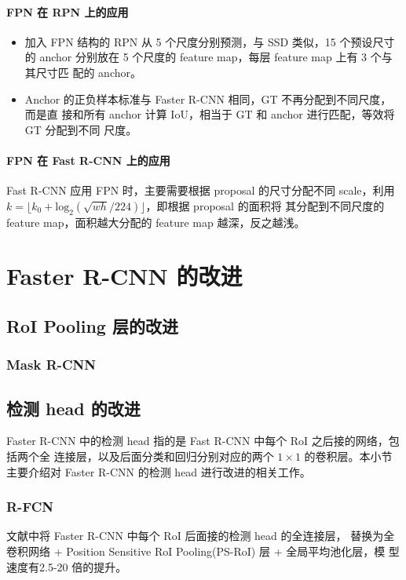 \paragraph{FPN 在 RPN 上的应用}

\begin{itemize}
  \item 加入 FPN 结构的 RPN 从 5 个尺度分别预测，与 SSD 类似，15 个预设尺寸的
    anchor 分别放在 5 个尺度的 feature map，每层 feature map 上有 3 个与其尺寸匹
    配的 anchor。
  \item Anchor 的正负样本标准与 Faster R-CNN 相同，GT 不再分配到不同尺度，而是直
    接和所有 anchor 计算 IoU，相当于 GT 和 anchor 进行匹配，等效将 GT 分配到不同
    尺度。
\end{itemize}

\paragraph{FPN 在 Fast R-CNN 上的应用}

Fast R-CNN 应用 FPN 时，主要需要根据 proposal 的尺寸分配不同 scale，利用 $ k =
\lfloor k_0 + \mathrm{log}_2 ( \sqrt{wh}/224 ) \rfloor$，即根据 proposal 的面积将
其分配到不同尺度的 feature map，面积越大分配的 feature map 越深，反之越浅。

\section{Faster R-CNN 的改进}
\label{sec:faster-improve}

\subsection{RoI Pooling 层的改进}
\subsubsection{Mask R-CNN}

\subsection{检测 head 的改进}
Faster R-CNN 中的检测 head 指的是 Fast R-CNN 中每个 RoI 之后接的网络，包括两个全
连接层，以及后面分类和回归分别对应的两个 $1 \times 1$ 的卷积层。本小节主要介绍对
Faster R-CNN 的检测 head 进行改进的相关工作。

\subsubsection{R-FCN}
文献中将 Faster R-CNN 中每个 RoI 后面接的检测 head 的全连接层，
替换为全卷积网络 + Position Sensitive RoI Pooling(PS-RoI) 层 + 全局平均池化层，模
型速度有2.5-20 倍的提升。


